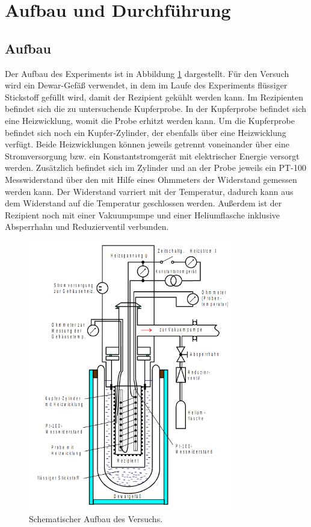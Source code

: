\section{Aufbau und Durchführung}
\label{sec:AundD}

\subsection{Aufbau}
\label{sec:Aufbau}

Der Aufbau des Experiments ist in Abbildung \ref{fig:aufbau} dargestellt. Für den Versuch wird ein Dewar-Gefäß verwendet, in dem im Laufe des Experiments flüssiger Stickstoff gefüllt wird, damit der
Rezipient gekühlt werden kann. Im Rezipienten befindet sich die zu untersuchende Kupferprobe. In der Kupferprobe befindet sich eine Heizwicklung, womit die Probe erhitzt werden kann. Um die Kupferprobe befindet sich noch ein Kupfer-Zylinder, der ebenfalls über eine Heizwicklung verfügt. Beide Heizwicklungen können jeweils getrennt voneinander über eine Stromversorgung bzw. ein Konstantstromgerät mit elektrischer Energie versorgt werden. Zusätzlich befindet sich im Zylinder und an der Probe jeweils ein PT-100 Messwiderstand über den mit Hilfe eines Ohmmeters der Widerstand gemessen werden kann. Der Widerstand varriert mit der Temperatur, dadurch kann aus dem Widerstand auf die Temperatur geschlossen werden. Außerdem ist der Rezipient noch mit einer Vakuumpumpe und einer Heliumflasche inklusive Absperrhahn und Reduzierventil verbunden. 

\begin{figure}[H]
    \centering
    \includegraphics[width=0.8\textwidth]{build/Aufbau.PNG}
    \caption{Schematischer Aufbau des Versuchs. \cite{Anleitung}}
    \label{fig:aufbau}
\end{figure}

